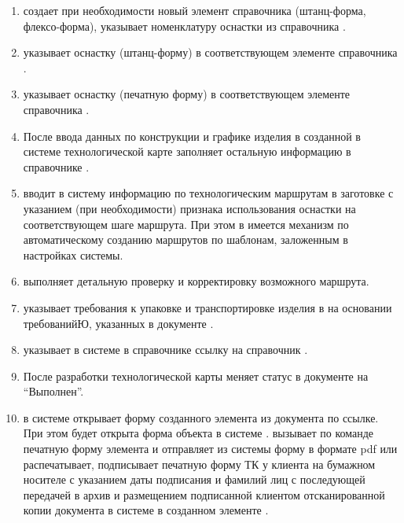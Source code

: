 \begin{enumerate}



\item	\tehnolog  создает при необходимости новый элемент справочника  (штанц-форма, флексо-форма), указывает номенклатуру оснастки из справочника . 
\item	\tehnolog  указывает оснастку (штанц-форму) в соответствующем элементе справочника . 
\item \tehnolog  указывает оснастку (печатную форму) в соответствующем элементе справочника .
\item	После ввода данных по конструкции и графике изделия в созданной в системе \gofro технологической карте \tehnolog заполняет остальную информацию в справочнике .
\item	\tehnolog  вводит в систему \gofro информацию по технологическим маршрутам в заготовке   с указанием (при необходимости) признака использования оснастки на соответствующем шаге маршрута. При этом в \gofro имеется механизм по автоматическому созданию маршрутов по шаблонам, заложенным в настройках системы.

\item	\tehnolog выполняет детальную проверку и корректировку возможного маршрута.
\item	\tehnolog указывает требования к упаковке и транспортировке изделия в  на основании требованийЮ, указанных в документе .
\item	\tehnolog указывает в системе \gofro в справочнике  ссылку на справочник .
\item	После разработки технологической карты \tehnolog меняет статус в документе  на “Выполнен”. 
\item	\manager в системе \erp открывает форму созданного элемента  из документа  по ссылке. При этом будет открыта форма объекта  в системе \gofro.
\manager вызывает по команде  печатную форму элемента  и отправляет из системы \gofro форму в формате pdf или распечатывает, подписывает печатную форму ТК у клиента на бумажном носителе с указанием даты подписания и фамилий лиц с последующей передачей в архив и размещением подписанной клиентом отсканированной копии документа в системе \gofro в созданном элементе .


\end{enumerate}
